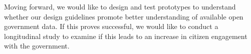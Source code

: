 \documentclass{sigchi}
\begin{document}
Moving forward, we would like to design and test prototypes to understand whether our design guidelines promote better understanding of available open government data. If this proves successful, we would like to conduct a longitudinal study to examine if this leads to an increase in citizen engagement with the government. 

%
%
%
%
%
\balance{}
\balance{}



\end{document}
